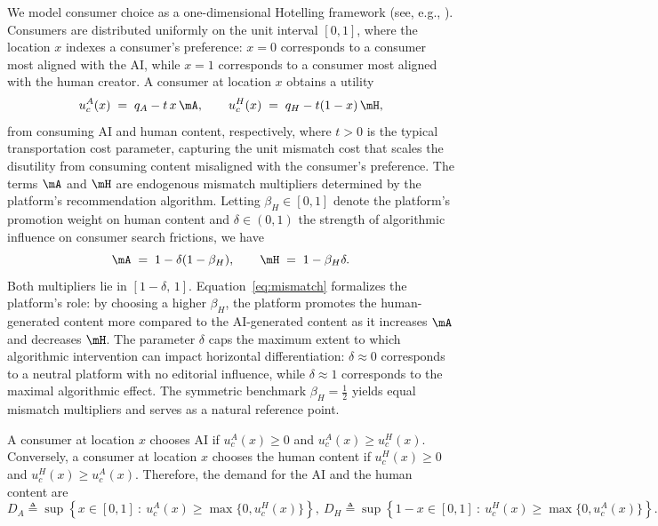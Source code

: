 We model consumer choice as a one-dimensional Hotelling framework (see, e.g., \cite[Chapter 7]{tirole1988theory}). 
Consumers are distributed uniformly on the unit interval $[0,1]$, 
where the location $x$ indexes a consumer's preference: $x=0$ 
corresponds to a consumer most aligned with the AI, while $x=1$ 
corresponds to a consumer most aligned with the human creator. A 
consumer at location $x$ obtains a utility
\begin{equation}\label{eq:utility}
u_{c}^A(x) \;=\; q_A - t\,x\,\mA, 
\qquad 
u_c^H(x) \;=\; q_H - t(1-x)\,\mH,
\end{equation}
from consuming AI and human content, respectively, where $t > 0$ is 
the typical transportation cost parameter, capturing the unit {mismatch cost} that scales the disutility from 
consuming content misaligned with the consumer's preference. The terms $\mA$ and 
$\mH$ are endogenous mismatch multipliers determined by the 
platform's recommendation algorithm. Letting $\beta_H \in [0,1]$ 
denote the platform's promotion weight on human content and 
$\delta \in (0,1)$ the strength of algorithmic influence on consumer 
search frictions, we have 
\begin{equation}\label{eq:mismatch}
\mA \;=\; 1 - \delta(1-\beta_H), 
\qquad 
\mH \;=\; 1 - \beta_H\delta.
\end{equation}
Both multipliers lie in $[1-\delta,\,1]$. 
Equation~\eqref{eq:mismatch} formalizes the platform's 
role: by choosing a higher $\beta_H$, the platform promotes the human-generated content more compared to the AI-generated content as it increases 
$\mA$ and decreases $\mH$. The parameter $\delta$ caps the 
maximum extent to which algorithmic intervention can impact horizontal differentiation: $\delta \approx 0$ corresponds to 
a neutral platform with no editorial influence, while $\delta \approx 1$ 
corresponds to the maximal algorithmic effect. The symmetric benchmark 
$\beta_H = \tfrac{1}{2}$ yields equal mismatch multipliers and 
serves as a natural reference point.

A consumer at location $x$ chooses AI if $u_c^A(x) \geq 0$ and $u_c^A(x) \geq u_c^H(x)$. Conversely, a consumer at location $x$ chooses the human content if $u_c^H(x) \geq 0$ and $u_c^H(x) \geq u_c^A(x)$. Therefore, the demand for the AI and the human content are 
\begin{equation*}
D_A \triangleq \sup\left\{x \in [0,1]~:~ u_c^A(x) \geq \max\{0, u_c^H(x)\}\right\}, 
~ 
D_H \triangleq \sup\left\{1-x \in [0,1]~:~ u_c^H(x) \geq \max\{0, u_c^A(x)\}\right\}.
\end{equation*}

